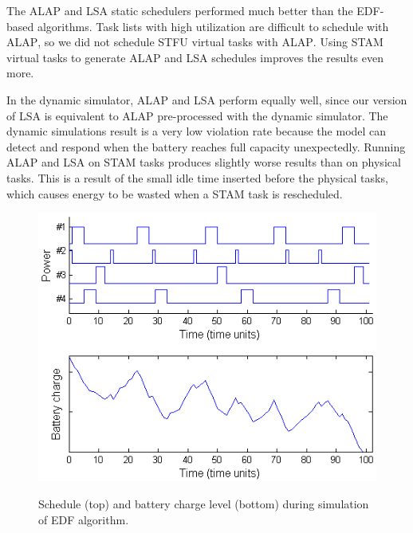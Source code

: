 The \textsc{ALAP} and \textsc{LSA} static schedulers performed much better than the \textsc{EDF}-based algorithms.  Task lists with high utilization are difficult to schedule with \textsc{ALAP}, so we did not schedule \textsc{STFU} virtual tasks with \textsc{ALAP}.  Using \textsc{STAM} virtual tasks to generate \textsc{ALAP} and \textsc{LSA} schedules improves the results even more.

In the dynamic simulator, \textsc{ALAP} and \textsc{LSA} perform equally well, since our version of \textsc{LSA} is equivalent to \textsc{ALAP} pre-processed with the dynamic simulator.  The dynamic simulations result is a very low violation rate because the model can detect and respond when the battery reaches full capacity unexpectedly.  Running \textsc{ALAP} and \textsc{LSA} on \textsc{STAM} tasks produces slightly worse results than on physical tasks.  This is a result of the small idle time inserted before the physical tasks, which causes energy to be wasted when a \textsc{STAM} task is rescheduled.

\begin{figure}[tb]
\begin{center}
\includegraphics[scale=0.57]{edfbattery.png}
\label{fig:edfbattery}
\caption{Schedule (top) and battery charge level (bottom) during simulation of EDF algorithm.}
\end{center}
\end{figure}

